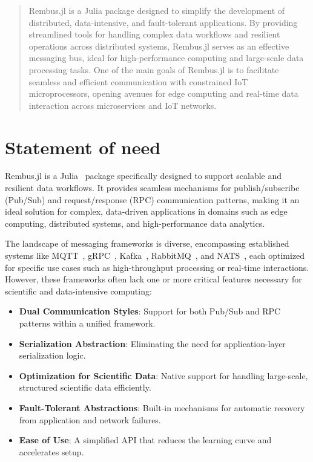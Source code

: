 \documentclass{juliacon}
\begin{document}


\maketitle

\begin{abstract}

Rembus.jl is a Julia package designed to simplify the development of
distributed, data-intensive, and fault-tolerant applications.
By providing streamlined tools for handling complex data workflows and resilient
operations across distributed systems, Rembus.jl serves as an effective messaging
bus, ideal for high-performance computing and large-scale data processing tasks.
One of the main goals of Rembus.jl is to facilitate seamless and efficient
communication with constrained IoT microprocessors, opening avenues
for edge computing and real-time data interaction across microservices and IoT
networks.

\end{abstract}

\section{Statement of need}

Rembus.jl is a Julia~\cite{bezanson2017julia} package specifically designed to
support scalable and resilient data workflows. It provides seamless mechanisms
for publish/subscribe (Pub/Sub) and request/response (RPC) communication patterns,
making it an ideal solution for complex, data-driven applications in domains such
as edge computing, distributed systems, and high-performance data analytics.
\vskip 6pt

The landscape of messaging frameworks is diverse, encompassing established systems
like MQTT~\cite{MQTT}, gRPC~\cite{gRPC}, Kafka~\cite{Kafka}, RabbitMQ~\cite{RabbitMQ},
and NATS~\cite{NATS}, each optimized for specific use cases such as high-throughput
processing or real-time interactions. However, these frameworks often lack one
or more critical features necessary for scientific and data-intensive computing:

 \begin{itemize}
  \item \textbf{Dual Communication Styles}: Support for both Pub/Sub and RPC patterns within a unified framework.
  \item \textbf{Serialization Abstraction}: Eliminating the need for application-layer serialization logic.
  \item \textbf{Optimization for Scientific Data}: Native support for handling large-scale, structured scientific data efficiently.
  \item \textbf{Fault-Tolerant Abstractions}: Built-in mechanisms for automatic recovery from application and network failures.
  \item \textbf{Ease of Use}: A simplified API that reduces the learning curve and accelerates setup.
 \end{itemize}
  
\end{document}
